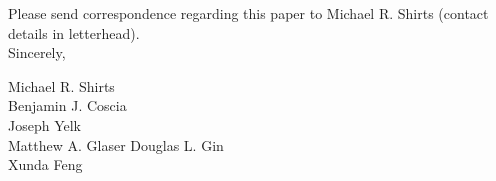 \documentclass[fontsize=11pt]{article}
\begin{document}
	\noindent Please send correspondence regarding this paper to Michael R. Shirts (contact
	details in letterhead).\\	
	
	\noindent Sincerely,
	
	\noindent Michael R. Shirts \\
    \noindent Benjamin J. Coscia \\
    \noindent Joseph Yelk \\
    \noindent Matthew A. Glaser
    \noindent Douglas L. Gin \\
    \noindent Xunda Feng \\
	
\end{document}
